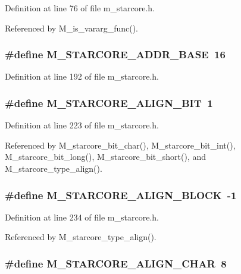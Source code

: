 Definition at line 76 of file m\_\-starcore.h.

Referenced by M\_\-is\_\-vararg\_\-func().
\subsubsection{\setlength{\rightskip}{0pt plus 5cm}\#define M\_\-STARCORE\_\-ADDR\_\-BASE~16}\label{m__starcore_8h_c2e2b9dacfc19aa38eea795374122d26}




Definition at line 192 of file m\_\-starcore.h.
\subsubsection{\setlength{\rightskip}{0pt plus 5cm}\#define M\_\-STARCORE\_\-ALIGN\_\-BIT~1}\label{m__starcore_8h_511bb8dd092a6a797500591b4cbc622f}




Definition at line 223 of file m\_\-starcore.h.

Referenced by M\_\-starcore\_\-bit\_\-char(), M\_\-starcore\_\-bit\_\-int(), M\_\-starcore\_\-bit\_\-long(), M\_\-starcore\_\-bit\_\-short(), and M\_\-starcore\_\-type\_\-align().
\subsubsection{\setlength{\rightskip}{0pt plus 5cm}\#define M\_\-STARCORE\_\-ALIGN\_\-BLOCK~-1}\label{m__starcore_8h_a607694028230f4c6a330f85fcc68f5a}




Definition at line 234 of file m\_\-starcore.h.

Referenced by M\_\-starcore\_\-type\_\-align().
\subsubsection{\setlength{\rightskip}{0pt plus 5cm}\#define M\_\-STARCORE\_\-ALIGN\_\-CHAR~8}\label{m__starcore_8h_4066ac289759f13bc977fb719379d7f6}




